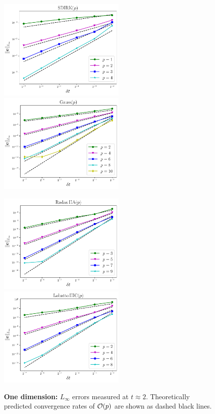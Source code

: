 \documentclass[review]{siamart}
\begin{document}
\begin{figure}[H]
\centerline{
\includegraphics[width = 0.55\textwidth]{figures/SDIRK_d1_FD4}
\quad
\includegraphics[width = 0.55\textwidth]{figures/Gauss_d1_FD4}
}
\centerline{
\includegraphics[width = 0.55\textwidth]{figures/RadauIIA_d1_FD4}
\quad
\includegraphics[width = 0.55\textwidth]{figures/LobattoIIIC_d1_FD4}
}
\caption{\textbf{One dimension:} $L_{\infty}$ errors measured at $t \approx 2$. Theoretically predicted convergence rates of ${\cal O}(p)$ are shown as dashed black lines.
\label{fig:errors1D}
}
\end{figure}
\end{document}
